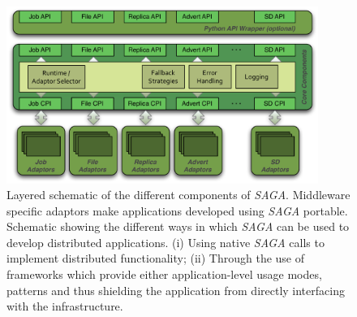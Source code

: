 \documentclass[a4paper,10pt]{article}
\newcommand{\sagaimpl}{\textit{SAGA}\xspace}
\newcommand{\impl}{\sagaimpl}
\begin{document}
\begin{figure}[hb]
  \centering
  \includegraphics[width=4in]{./figures/saga-architecture}
 \vspace{-1em}	
  \caption{\footnotesize Layered schematic of the different
    components of \impl.  Middleware specific adaptors make
    applications developed using \impl portable.  Schematic showing
    the different ways in which \impl can be used to develop
    distributed applications. (i) Using native \impl calls to
    implement distributed functionality; (ii) Through the use of
    frameworks which provide either application-level usage modes,
    patterns and thus shielding the application from directly
    interfacing with the infrastructure.}
  \label{fig:saga_arch}
\end{figure}

  
 
\end{document}
